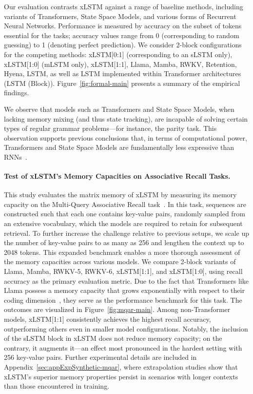 Our evaluation contrasts xLSTM against a range of baseline methods, including variants of Transformers, State Space Models, and various forms of Recurrent Neural Networks. Performance is measured by accuracy on the subset of tokens essential for the tasks; accuracy values range from 0 (corresponding to random guessing) to 1 (denoting perfect prediction). We consider 2-block configurations for the competing methods: xLSTM[0:1] (corresponding to an sLSTM only), xLSTM[1:0] (mLSTM only), xLSTM[1:1], Llama, Mamba, RWKV, Retention, Hyena, LSTM, as well as LSTM implemented within Transformer architectures (LSTM (Block)). Figure~\ref{fig:formal-main} presents a summary of the empirical findings. 

We observe that models such as Transformers and State Space Models, when lacking memory mixing (and thus state tracking), are incapable of solving certain types of regular grammar problems—for instance, the parity task. This observation supports previous conclusions that, in terms of computational power, Transformers and State Space Models are fundamentally less expressive than RNNs~\citep{Merrill:24, Merrill:23, Deletang:23}.

\paragraph{Test of xLSTM's Memory Capacities on Associative Recall Tasks.} This study evaluates the matrix memory of xLSTM by measuring its memory capacity on the Multi-Query Associative Recall task~\citep{Arora:23arxiv}. In this task, sequences are constructed such that each one contains key-value pairs, randomly sampled from an extensive vocabulary, which the models are required to retain for subsequent retrieval. To further increase the challenge relative to previous setups, we scale up the number of key-value pairs to as many as 256 and lengthen the context up to 2048 tokens. This expanded benchmark enables a more thorough assessment of the memory capacities across various models. We compare 2-block variants of Llama, Mamba, RWKV-5, RWKV-6, xLSTM[1:1], and xLSTM[1:0], using recall accuracy as the primary evaluation metric. Due to the fact that Transformers like Llama possess a memory capacity that grows exponentially with respect to their coding dimension~\citep{Ramsauer:21}, they serve as the performance benchmark for this task. The outcomes are visualized in Figure~\ref{fig:mqar-main}. 
Among non-Transformer models, xLSTM[1:1] consistently achieves the highest recall accuracy, outperforming others even in smaller model configurations. Notably, the inclusion of the sLSTM block in xLSTM does not reduce memory capacity; on the contrary, it augments it—an effect most pronounced in the hardest setting with 256 key-value pairs. Further experimental details are included in Appendix~\ref{sec:appExpSynthetic-mqar}, where extrapolation studies show that xLSTM's superior memory properties persist in scenarios with longer contexts than those encountered in training.

